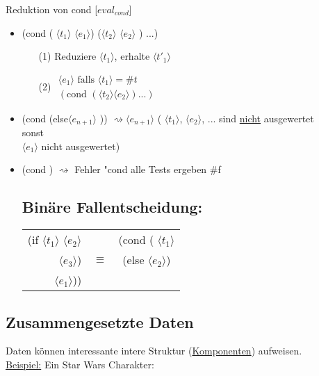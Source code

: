 \documentclass[a4paper,12pt]{article}
\begin{document}
Reduktion von cond [$eval_{cond}$]
\begin{itemize}
\item (cond ( $\langle t_1 \rangle$ $\langle e_1 \rangle$) ($\langle t_2 \rangle$ $\langle e_2 \rangle$ ) ...)
\begin{itemize}
\item[(1)] Reduziere $\langle t_1 \rangle$, erhalte $\langle t'_1 \rangle$
\item[(2)] $\begin{array}{l} \langle e_1 \rangle \text{ falls } \langle t_1 \rangle = \#t\\
(\text{cond } (\langle t_2 \rangle \langle e_2 \rangle)...)
\end{array}$
\end{itemize}
\item (cond (else$\langle e_{n+1} \rangle$ )) $\rightsquigarrow \langle e_{n+1} \rangle$
( $\langle t_1 \rangle$, $\langle e_2 \rangle$, ... sind \uline{nicht} ausgewertet\\
sonst \\
 $\langle e_1 \rangle$ nicht ausgewertet)
\item (cond ) $\rightsquigarrow$ Fehler "cond alle Tests ergeben \#f

\subsection{Binäre Fallentscheidung:}
\begin{tabular}{rcc}

(if  $\langle t_1 \rangle$  $\langle e_2 \rangle$ 	&		  & (cond ( $\langle t_1 \rangle$ \\
$\langle e_3 \rangle$) 								&$\equiv$ &(else  $\langle e_2 \rangle$) \\
$\langle e_1 \rangle$))								&		  & \														 
\end{tabular}
\end{itemize}
\subsection{Zusammengesetzte Daten}
Daten können interessante intere Struktur (\uline{Komponenten}) aufweisen.\\
\uline{Beispiel:} Ein Star Wars Charakter:\\
\end{document}
